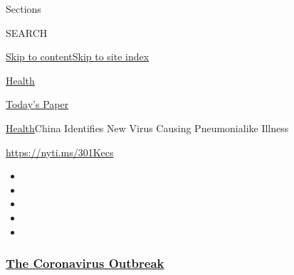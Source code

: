 Sections

SEARCH

\protect\hyperlink{site-content}{Skip to
content}\protect\hyperlink{site-index}{Skip to site index}

\href{https://www.nytimes3xbfgragh.onion/section/health}{Health}

\href{https://myaccount.nytimes3xbfgragh.onion/auth/login?response_type=cookie\&client_id=vi}{}

\href{https://www.nytimes3xbfgragh.onion/section/todayspaper}{Today's
Paper}

\href{/section/health}{Health}\textbar{}China Identifies New Virus
Causing Pneumonialike Illness

\url{https://nyti.ms/301Kecs}

\begin{itemize}
\item
\item
\item
\item
\item
\end{itemize}

\hypertarget{the-coronavirus-outbreak}{%
\subsubsection{\texorpdfstring{\href{https://www.nytimes3xbfgragh.onion/news-event/coronavirus?name=styln-coronavirus-national\&region=TOP_BANNER\&block=storyline_menu_recirc\&action=click\&pgtype=Article\&impression_id=e61df750-f2d9-11ea-b16d-01616827df08\&variant=undefined}{The
Coronavirus
Outbreak}}{The Coronavirus Outbreak}}\label{the-coronavirus-outbreak}}

